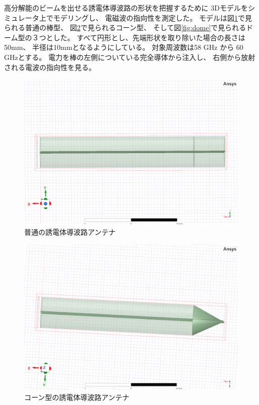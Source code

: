 \documentclass[technicalreport]{ieicej}
\begin{document}
高分解能のビームを出せる誘電体導波路の形状を把握するために
3Dモデルをシミュレータ上でモデリングし、
電磁波の指向性を測定した。
モデルは図\ref{fig:normal}で見られる普通の棒型、
図\ref{fig:cone}で見られるコーン型、
そして図\ref{fig:dome}で見られるドーム型の３つとした。
すべて円形とし、先端形状を取り除いた場合の長さは50mm、
半径は10mmとなるようにしている。
対象周波数は58 GHz から 60 GHzとする。
電力を棒の左側についている完全導体から注入し、
右側から放射される電波の指向性を見る。

\begin{figure}[tb]
  \begin{center}
    \includegraphics[bb=0 0 384 262, width=0.7\linewidth]{img/normal.pdf}
    \caption{普通の誘電体導波路アンテナ}
    \label{fig:normal}
  \end{center}
\end{figure}

\begin{figure}[tb]
  \begin{center}
    \includegraphics[bb=0 0 384 262, width=0.7\linewidth]{img/cone.pdf}
    \caption{コーン型の誘電体導波路アンテナ}
    \label{fig:cone}
  \end{center}
\end{figure}
\end{document}
